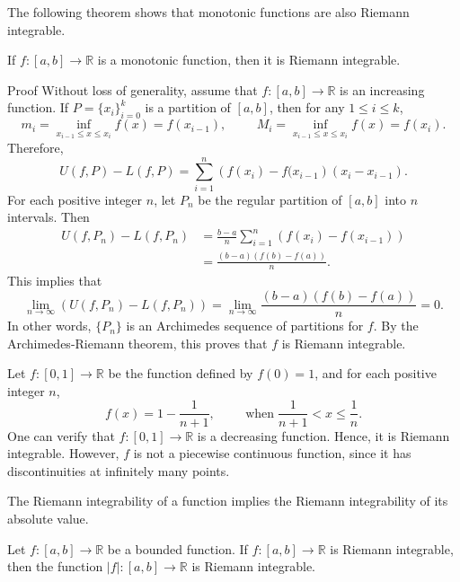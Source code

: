 The following theorem shows that  monotonic functions are also Riemann integrable.
\begin{theorem}{}
If  $f:[a,b]\to\mathbb{R}$   is a monotonic function, then   it  is Riemann integrable.
\end{theorem}
\begin{myproof}{Proof} Without loss of generality, assume that $f:[a,b]\to\mathbb{R}$ is an increasing function. If $P=\{x_i\}_{i=0}^k$ is a partition of $[a,b]$, then for any $1\leq i\leq k$,
\[m_i=\inf_{x_{i-1}\leq x\leq x_i}f(x)=f(x_{i-1}),\hspace{1cm}M_i=\inf_{x_{i-1}\leq x\leq x_i}f(x)=f(x_i).\]
Therefore,
\[U(f,P)-L(f,P)=\sum_{i=1}^n\left(f(x_i)-f(x_{i-1}\right)(x_i-x_{i-1}).\]
For each positive integer $n$, let $P_n$ be the regular partition of $[a, b]$ into $n$ intervals. Then
\begin{align*}U(f, P_n)-L(f, P_n)&=\frac{b-a}{n}\sum_{i=1}^n\left(f(x_i)-f(x_{i-1})\right)\\&=\frac{(b-a)\left(f(b)-f(a)\right)}{n}.\end{align*}
\bp
This implies that
\[\lim_{n\to \infty}\left(U(f, P_n)-L(f, P_n)\right)=\lim_{n\to \infty}\frac{(b-a)\left(f(b)-f(a)\right)}{n}=0.\]
In other words, $\{P_n\}$ is an Archimedes sequence of partitions for $f$. By the Archimedes-Riemann theorem, this proves that $f$ is Riemann integrable.
\end{myproof}
\begin{example}{}
Let $f:[0,1]\to\mathbb{R}$ be the function defined by $f(0)=1$, and for each positive integer $n$, 
\[f(x)=1-\frac{1}{n+1},\hspace{1cm}\text{when}\; \frac{1}{n+1}<x\leq\frac{1}{n}.\]
One can verify that $f:[0,1]\to\mathbb{R}$ is a decreasing function. Hence, it is Riemann integrable.
However, $f$ is not a piecewise continuous function, since it has discontinuities at infinitely many points. 
\end{example}

The Riemann integrability of a function implies the Riemann integrability of its absolute value.
\begin{theorem}[label=230221_15]{}
Let $f:[a,b]\to\mathbb{R}$   be a bounded function. If  $f:[a,b]\to\mathbb{R}$ is Riemann integrable, then the function  $|f|:[a,b]\to\mathbb{R}$ is Riemann integrable.
\end{theorem}

